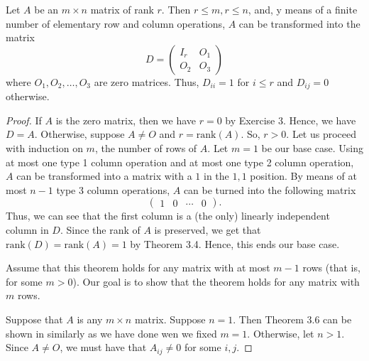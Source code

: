 \begin{theorem}\label{Theorem 3.6}
    Let \( A  \) be an \( m \times n  \) matrix of rank \( r  \). Then \( r \leq m, r \leq n  \), and, y means of a finite number of elementary row and column operations, \( A  \) can be transformed into the matrix 
    \[  D = \begin{pmatrix}
        {I}_{r} & {O}_{1} \\
        {O}_{2} & {O}_{3}
    \end{pmatrix} \]
    where \( {O}_{1}, {O}_{2}, \dots, {O}_{3} \) are zero matrices. Thus, \( {D}_{ii} = 1  \) for \( i \leq r  \) and \( {D}_{ij} = 0  \) otherwise.
\end{theorem}
\begin{proof}
If \( A  \) is the zero matrix, then we have \( r = 0  \) by Exercise 3. Hence, we have \( D = A  \). 
    Otherwise, suppose \( A \neq  O  \) and \( r = \text{rank}(A ) \). So, \( r > 0  \). Let us proceed with induction on \(  m  \), the number of rows of \( A  \). Let \( m = 1  \) be our base case. Using at most one type 1 column operation and at most one type 2 column operation, \( A  \) can be transformed into a matrix with a \( 1  \) in the \( 1,1  \) position. By means of at most \( n - 1  \) type 3 column operations, \( A  \) can be turned into the following matrix
    \[  \begin{pmatrix} 
        1 & 0 & \cdots & 0 
              \end{pmatrix}. \]
              Thus, we can see that the first column is a (the only) linearly independent column in \( D  \). Since the rank of \( A  \) is preserved, we get that \( \text{rank}(D) = \text{rank}(A) = 1  \) by Theorem 3.4. Hence, this ends our base case.

              Assume that this theorem holds for any matrix with at most \( m - 1  \) rows (that is, for some \( m > 0  \)). Our goal is to show that the theorem holds for any matrix with \( m  \) rows.

    Suppose that \( A  \) is any \( m \times n  \) matrix. Suppose \( n = 1  \). Then Theorem 3.6 can be shown in similarly as we have done wen we fixed \(  m =1  \). Otherwise, let \(  n > 1  \). Since \( A \neq O  \), we must have that \( {A}_{ij} \neq 0  \) for some \( i,j  \). 


\end{proof}

